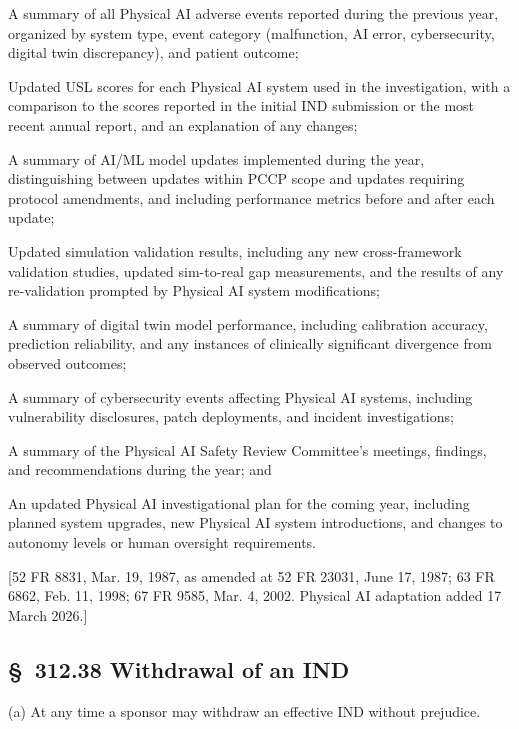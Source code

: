 \documentclass[11pt]{article}
\begin{document}
\begin{description}[leftmargin=0.8cm,style=sameline]
\item[(i)] A summary of all Physical AI adverse events reported during the previous year, organized by system type, event category (malfunction, AI error, cybersecurity, digital twin discrepancy), and patient outcome;
\item[(ii)] Updated USL scores for each Physical AI system used in the investigation, with a comparison to the scores reported in the initial IND submission or the most recent annual report, and an explanation of any changes;
\item[(iii)] A summary of AI/ML model updates implemented during the year, distinguishing between updates within PCCP scope and updates requiring protocol amendments, and including performance metrics before and after each update;
\item[(iv)] Updated simulation validation results, including any new cross-framework validation studies, updated sim-to-real gap measurements, and the results of any re-validation prompted by Physical AI system modifications;
\item[(v)] A summary of digital twin model performance, including calibration accuracy, prediction reliability, and any instances of clinically significant divergence from observed outcomes;
\item[(vi)] A summary of cybersecurity events affecting Physical AI systems, including vulnerability disclosures, patch deployments, and incident investigations;
\item[(vii)] A summary of the Physical AI Safety Review Committee's meetings, findings, and recommendations during the year; and
\item[(viii)] An updated Physical AI investigational plan for the coming year, including planned system upgrades, new Physical AI system introductions, and changes to autonomy levels or human oversight requirements.
\end{description}

[52 FR 8831, Mar. 19, 1987, as amended at 52 FR 23031, June 17, 1987; 63 FR 6862, Feb. 11, 1998; 67 FR 9585, Mar. 4, 2002. Physical AI adaptation added 17 March 2026.]

\subsection{\S~312.38 Withdrawal of an IND}

(a) At any time a sponsor may withdraw an effective IND without prejudice.
\end{document}
